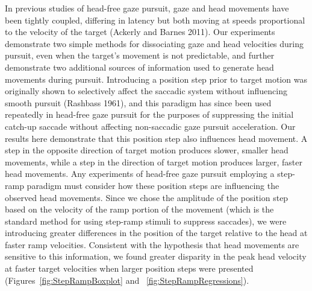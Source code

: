 \documentclass[12pt]{article}
\begin{document}
In previous studies of head-free gaze pursuit, gaze and head movements have been tightly coupled, differing in latency but both moving at speeds proportional to the velocity of the target (Ackerly and Barnes 2011). Our experiments demonstrate two simple methods for dissociating gaze and head velocities during pursuit, even when the target's movement is not predictable, and further demonstrate two additional sources of information used to generate head movements during pursuit.  Introducing a position step prior to target motion was originally shown to selectively affect the saccadic system without influencing smooth pursuit (Rashbass 1961), and this paradigm has since been used repeatedly in head-free gaze pursuit for the purposes of suppressing the initial catch-up saccade without affecting non-saccadic gaze pursuit acceleration. Our results here demonstrate that this position step also influences head movement. A step in the opposite direction of target motion produces slower, smaller head movements, while a step in the direction of target motion produces larger, faster head movements. Any experiments of head-free gaze pursuit employing a step-ramp paradigm must consider how these position steps are influencing the observed head movements. Since we chose the amplitude of the position step based on the velocity of the ramp portion of the movement (which is the standard method for using step-ramp stimuli to suppress saccades), we were introducing greater differences in the position of the target relative to the head at faster ramp velocities. Consistent with the hypothesis that head movements are sensitive to this information, we found greater disparity in the peak head velocity at faster target velocities when larger position steps were presented (Figures~\ref{fig:StepRampBoxplot} and ~\ref{fig:StepRampRegressions}).
\end{document}
